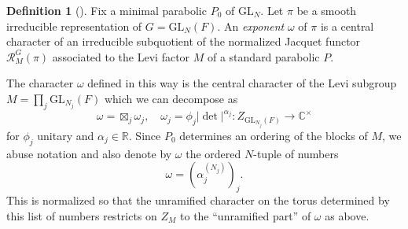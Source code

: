 \documentclass{amsart}
\newcommand{\mc}[1]{\mathcal{#1}}
\newcommand{\C}{\mathbb C}
\newcommand{\R}{\mathbb R}
\newcommand{\GL}{\mathrm{GL}}
\newcommand{\om}{\omega}
\newcommand{\1}{\m 1}
\theoremstyle{remark}
\theoremstyle{definition}
\newtheorem{dfn}[thm]{Definition}
\numberwithin{equation}{subsection}
\begin{document}



\begin{dfn}[\cite{casselman1995introduction,HC73}]
Fix a minimal parabolic $P_0$ of $\GL_N$. Let $\pi$ be a smooth irreducible representation of $G = \GL_N(F)$. An \emph{exponent} $\om$ of $\pi$ is a central character of an irreducible subquotient of the normalized Jacquet functor $\mc R^G_M(\pi)$ associated to the Levi factor $M$ of a standard parabolic $P$. 
\end{dfn}

The character $\omega$ defined in this way is the central character of the Levi subgroup $M = \prod_j \GL_{N_j}(F)$ which we can decompose as
\[ 
\omega = \boxtimes_j\omega_j, \quad \omega_j = \phi_j|\det|^{\alpha_j} : Z_{\GL_{N_j}(F)} \to \C^\times
\]
for $\phi_j$ unitary and $\alpha_j \in \R$. Since $P_0$ determines an ordering of the blocks of $M$, we abuse notation and also denote by $\om$ the ordered $N$-tuple of numbers
\[ 
\om = \left(\alpha_j^{(N_j)}\right)_j. 
\]
This is normalized so that the unramified character on the torus determined by this list of numbers restricts on $Z_M$ to the ``unramified part'' of $\om$ as above. 
\end{document}
